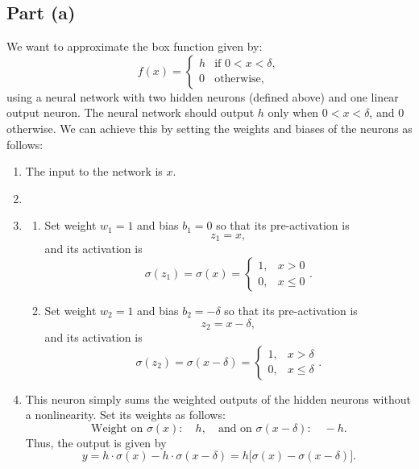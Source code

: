 \documentclass{article}
\begin{document}
\subsection*{Part (a)}
We want to approximate the box function given by:
\[
f(x) = \begin{cases}
h & \text{if } 0 < x < \delta, \\
0 & \text{otherwise,}
\end{cases}
\]
using a neural network with two hidden neurons (defined above) and one linear output neuron. The neural network should output \( h \) only when \( 0 < x < \delta \), and 0 otherwise. We can achieve this by setting the weights and biases of the neurons as follows:
\begin{enumerate}
    \item {}  
          The input to the network is \( x \).
    \item {}
    \item \begin{enumerate}
        \item {} Set weight \( w_1 = 1 \) and bias \( b_1 = 0 \) so that its pre-activation is
              \[
              z_1 = x,
              \]
              and its activation is 
              \[
              \sigma(z_1) = \sigma(x) = \begin{cases} 1, & x > 0 \\ 0, & x \le 0 \end{cases}.
              \]
        \item {} Set weight \( w_2 = 1 \) and bias \( b_2 = -\delta \) so that its pre-activation is
                  \[
                  z_2 = x - \delta,
                  \]
                  and its activation is 
                  \[
                  \sigma(z_2) = \sigma(x-\delta) = \begin{cases} 1, & x > \delta \\ 0, & x \le \delta \end{cases}.
                  \]
    \end{enumerate}
    \item {}  
          This neuron simply sums the weighted outputs of the hidden neurons without a nonlinearity. Set its weights as follows:
          \[
          \text{Weight on } \sigma(x):\quad h, \quad \text{and on } \sigma(x-\delta):\quad -h.
          \]
          Thus, the output is given by
          \[
          y = h\cdot \sigma(x) - h\cdot \sigma(x-\delta) = h\bigl[\sigma(x) - \sigma(x-\delta)\bigr].
          \]
\end{enumerate}
\end{document}

